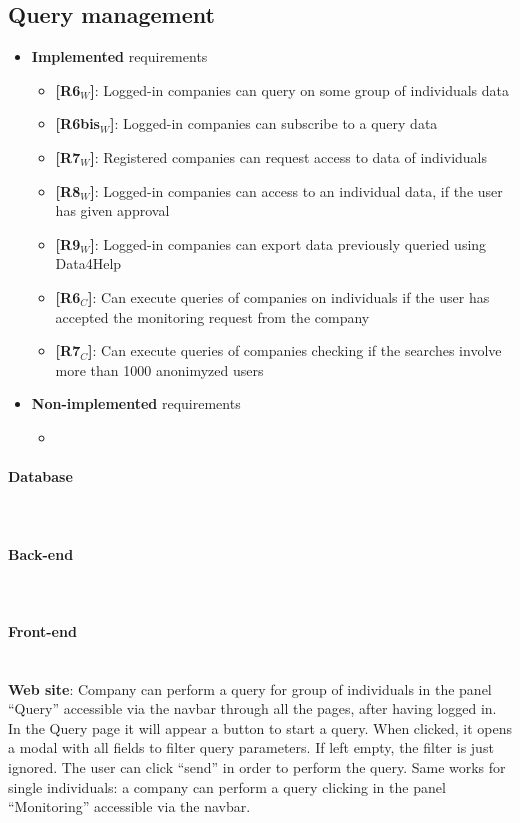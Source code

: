 \subsection{Query management}
\begin{itemize}
    \item \textbf{Implemented} requirements
        \begin{itemize}
    \item \textbf{[R6$_W$]}: Logged-in companies can query on some group of individuals data
    \item \textbf{[R6bis$_W$]}: Logged-in companies can subscribe to a query data
    \item \textbf{[R7$_W$]}: Registered companies can request access to data of individuals
    \item \textbf{[R8$_W$]}: Logged-in companies can access to an individual data, if the user has given approval
    \item \textbf{[R9$_W$]}: Logged-in companies can export data previously queried using Data4Help

    \item \textbf{[R6$_C$]}: Can execute queries of companies on individuals if the user has accepted the monitoring request from the company
    \item \textbf{[R7$_C$]}: Can execute queries of companies checking if the searches involve more than 1000 anonimyzed users 

        \end{itemize}
    \item \textbf{Non-implemented} requirements
    \begin{itemize}
            \item 
        \end{itemize}
\end{itemize}

\paragraph{Database} \mbox{}\\  
\paragraph{Back-end} \mbox{}\\  
\paragraph{Front-end} \mbox{}\\
\textbf{Web site}: Company can perform a query for group of individuals in the panel “Query” accessible via the navbar through all the pages, after having logged in.
In the Query page it will appear a button to start a query. When clicked, it opens a modal with all fields to filter query parameters.
If left empty, the filter is just ignored.
The user can click “send” in order to perform the query.
Same works for single individuals: a company can perform a query clicking in the panel “Monitoring” accessible via the navbar.

